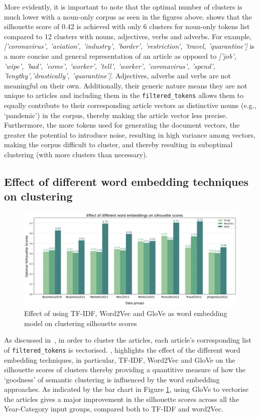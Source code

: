 \vspace*{-1em}
More evidently, it is important to note that the optimal number of clusters is much lower with a noun-only corpus as seen in the figures above.  shows that the silhouette score of 0.42 is achieved with only 6 clusters for noun-only tokens list compared to 12 clusters with nouns, adjectives, verbs and adverbs. For example, \textit{['coronavirus', 'aviation', 'industry', 'border', 'restriction', 'travel, 'quarantine']} is a more concise and general representation of an article as opposed to \textit{['job', 'wipe', 'bad', 'come', 'worker', 'tell', 'worker', 'coronavirus', 'spend', 'lengthy','drastically', 'quarantine']}. Adjectives, adverbs and verbs are not meaningful on their own. Additionally, their generic nature means they are not unique to articles and including them in the \texttt{filtered\_tokens} allows them to equally contribute to their corresponding article vectors as distinctive nouns (e.g., `pandemic') in the corpus, thereby making the article vector less precise. Furthermore, the more tokens used for generating the document vectors, the greater the potential to introduce noise, resulting in high variance among vectors, making the corpus difficult to cluster, and thereby resulting in suboptimal clustering (with more clusters than necessary).

\subsection{Effect of different word embedding techniques on clustering} \label{s:word_embeddings}

\begin{figure}[H]
\centering
\includegraphics[width=0.8\linewidth]{images/eval/word_embedding.png}
\caption{Effect of using TF-IDF, Word2Vec and GloVe as word embedding model on clustering silhouette scores}
\label{fig:word_embed}
\end{figure}
\vspace{-1em}
As discussed in~, in order to cluster the articles, each article's corresponding list of \texttt{filtered\_tokens} is vectorised. , highlights the effect of the different word embedding techniques, in particular, TF-IDF, Word2Vec and GloVe on the silhouette scores of clusters thereby providing a quantitive measure of how the `goodness' of semantic clustering is influenced by the word embedding approaches. As indicated by the bar chart in Figure \ref{fig:word_embed}, using GloVe to vectorise the articles gives a major improvement in the silhouette scores across all the Year-Category input groups, compared both to TF-IDF and word2Vec.

